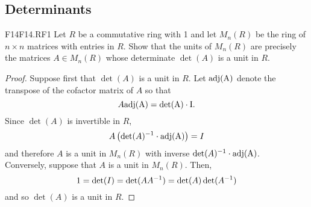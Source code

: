 \documentclass[../AlgebraQualSolutions.tex]{subfiles}
\begin{document}
\subsection{Determinants}

\begin{prob}{F14}{F14.RF1}
	Let $R$ be a commutative ring with 1 and let $M_n(R)$ be the ring of $n \times n$ matrices with entries in $R$. Show that the units of $M_n(R)$ are precisely the matrices $A \in M_n(R)$ whose determinate $\det(A)$ is a unit in $R$.
\end{prob}

\begin{proof}
	Suppose first that $\det(A)$ is a unit in $R$. Let $\rm{adj}(A)$ denote the transpose of the cofactor matrix of $A$ so that
		\[A \rm{adj}(A) = \det(A) \cdot I. \]
	Since $\det(A)$ is invertible in $R$,
		\[A\left(\det(A)^{-1} \cdot \rm{adj}(A)\right) = I\]
	and therefore $A$ is a unit in $M_n(R)$ with inverse $\det(A)^{-1} \cdot \rm{adj}(A)$.\\

	Conversely, suppose that $A$ is a unit in $M_n(R)$. Then,
		\[1 = \det(I) = \det(AA^{-1}) = \det(A)\det(A^{-1})\]
	and so $\det(A)$ is a unit in $R$.
\end{proof}
\end{document}
